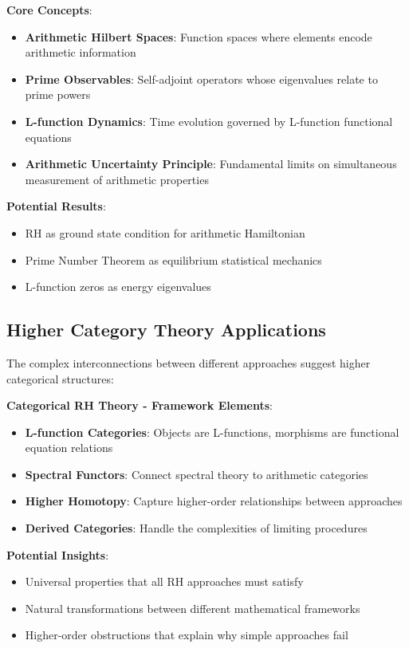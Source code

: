 \begin{framework}
\textbf{Core Concepts}:
\begin{itemize}
\item \textbf{Arithmetic Hilbert Spaces}: Function spaces where elements encode arithmetic information
\item \textbf{Prime Observables}: Self-adjoint operators whose eigenvalues relate to prime powers
\item \textbf{L-function Dynamics}: Time evolution governed by L-function functional equations
\item \textbf{Arithmetic Uncertainty Principle}: Fundamental limits on simultaneous measurement of arithmetic properties
\end{itemize}

\textbf{Potential Results}:
\begin{itemize}
\item RH as ground state condition for arithmetic Hamiltonian
\item Prime Number Theorem as equilibrium statistical mechanics
\item L-function zeros as energy eigenvalues
\end{itemize}
\end{framework}

\subsection{Higher Category Theory Applications}
\label{subsec:higher_category}

The complex interconnections between different approaches suggest higher categorical structures:

\noindent\textbf{Categorical RH Theory - Framework Elements}:
\begin{itemize}
\item \textbf{L-function Categories}: Objects are L-functions, morphisms are functional equation relations
\item \textbf{Spectral Functors}: Connect spectral theory to arithmetic categories
\item \textbf{Higher Homotopy}: Capture higher-order relationships between approaches
\item \textbf{Derived Categories}: Handle the complexities of limiting procedures
\end{itemize}

\textbf{Potential Insights}:
\begin{itemize}
\item Universal properties that all RH approaches must satisfy
\item Natural transformations between different mathematical frameworks
\item Higher-order obstructions that explain why simple approaches fail
\end{itemize}

